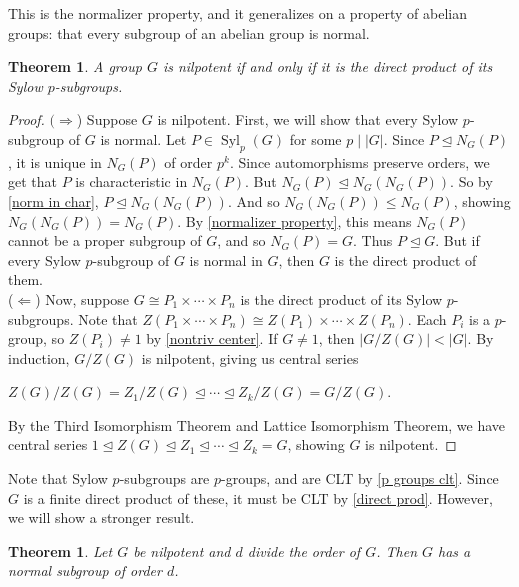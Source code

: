 \documentclass[12pt]{report}
\theoremstyle{newthm}
\newtheorem{Theorem}[lem]{Theorem}
\DeclareMathOperator{\Syl}{Syl}
\begin{document}
This is the normalizer property, and it generalizes on a property of abelian groups: that every subgroup of an abelian group is normal.


\begin{Theorem}\label{nilpotent equiv}\cite[pg 191]{DF}
A group $G$ is nilpotent if and only if it is the direct product of its Sylow $p$-subgroups.
\end{Theorem}

\begin{proof}
$(\Rightarrow$) Suppose $G$ is nilpotent. First, we will show that every Sylow $p$-subgroup of $G$ is normal. Let $P\in\Syl_p(G)$ for some $p\mid |G|$. Since $P\trianglelefteq N_G(P)$, it is unique in $N_G(P)$ of order $p^k$. Since automorphisms preserve orders, we get that $P$ is characteristic in $N_G(P)$. But $N_G(P)\trianglelefteq N_G(N_G(P))$. So by \cref{norm in char}, $P\trianglelefteq N_G(N_G(P))$. And so $N_G(N_G(P))\leq N_G(P)$, showing $N_G(N_G(P))=N_G(P)$. By \cref{normalizer property}, this means $N_G(P)$ cannot be a proper subgroup of $G$, and so $N_G(P)=G$. Thus $P\trianglelefteq G$. But if every Sylow $p$-subgroup of $G$ is normal in $G$, then $G$ is the direct product of them.\\
($\Leftarrow$) Now, suppose  $G\cong P_1\times\dotsi\times P_n$ is the direct product of its Sylow $p$-subgroups. Note that $Z(P_1\times\dotsi\times P_n)\cong Z(P_1)\times\dotsi\times Z(P_n)$. Each $P_i$ is a $p$-group, so $Z(P_i)\neq 1$ by \cref{nontriv center}. If $G\neq 1$, then $|G/Z(G)| < |G|$. By induction, $G/Z(G)$ is nilpotent, giving us central series 
\begin{center}$Z(G)/Z(G) = Z_1/Z(G)\trianglelefteq \dotsi\trianglelefteq Z_k/Z(G) = G/Z(G)$. \end{center} By the Third Isomorphism Theorem and Lattice Isomorphism Theorem, we have central series $1\trianglelefteq Z(G)\trianglelefteq Z_1\trianglelefteq\dotsi\trianglelefteq Z_k = G$, showing $G$ is nilpotent.
\end{proof}

Note that Sylow $p$-subgroups are $p$-groups, and are CLT by \cref{p groups clt}. Since $G$ is a finite direct product of these, it must be CLT by \cref{direct prod}. However, we will show a stronger result.


\begin{Theorem}\label{nilpotent super clt} Let $G$ be nilpotent and $d$ divide the order of $G$. Then $G$ has a normal subgroup of order $d$.
\end{Theorem}
\end{document}
